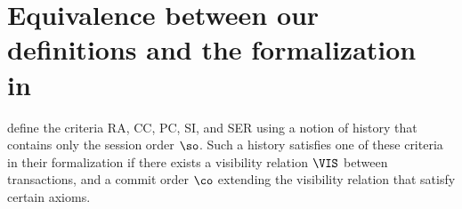 

\section{Equivalence between our definitions and the formalization in~\cite{DBLP:conf/concur/Cerone0G15}}\label{app:gotsman}


\citet{DBLP:conf/concur/Cerone0G15} define the criteria RA, CC, PC, SI, and SER using a notion of history that contains only the session order $\so$. Such a history satisfies one of these criteria in their formalization if there exists a visibility relation $\VIS$ between transactions, and a commit order $\co$ extending the visibility relation that satisfy certain axioms.

